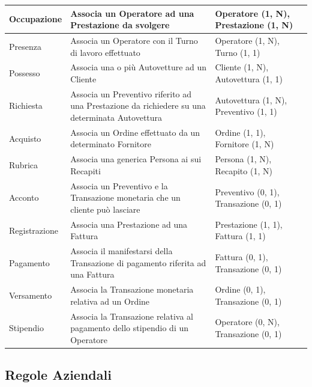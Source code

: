 {\begin{longtable}{| p{2cm} | p{4cm} | p{3cm} | p{3cm} |}
				Occupazione &
				Associa un Operatore ad una Prestazione da svolgere &
				Operatore (1, N), Prestazione (1, N) &
				\\ \hline

				Presenza &
				Associa un Operatore con il Turno di lavoro effettuato &
				Operatore (1, N), Turno (1, 1) &
				\\ \hline

				Possesso &
				Associa una o più Autovetture ad un Cliente &
				Cliente (1, N), Autovettura (1, 1) &
				\\ \hline

				Richiesta &
				Associa un Preventivo riferito ad una Prestazione da richiedere su una determinata Autovettura &
				Autovettura (1, N), Preventivo (1, 1) &
				\\ \hline

				Acquisto &
				Associa un Ordine effettuato da un determinato Fornitore &
				Ordine (1, 1), Fornitore (1, N) &
				\\ \hline

				Rubrica &
				Associa una generica Persona ai sui Recapiti &
				Persona (1, N), Recapito (1, N) &
				\\ \hline

				Acconto &
				Associa un Preventivo e la Transazione monetaria che un cliente può lasciare &
				Preventivo (0, 1), Transazione (0, 1) &
				\\ \hline

				Registrazione &
				Associa una Prestazione ad una Fattura &
				Prestazione (1, 1), Fattura (1, 1) &
				\\ \hline

				Pagamento &
				Associa il manifestarsi della Transazione di pagamento riferita ad una Fattura &
				Fattura (0, 1), Transazione (0, 1) &
				\\ \hline

				Versamento &
				Associa la Transazione monetaria relativa ad un Ordine &
				Ordine (0, 1), Transazione (0, 1) &
				\\ \hline

				Stipendio &
				Associa la Transazione relativa al pagamento dello stipendio di un Operatore &
				Operatore (0, N), Transazione (0, 1) &
				\\ \hline

			\end{longtable}
			}
		
	
	\subsection{Regole Aziendali}
	\label{sec:business_rules}
	
